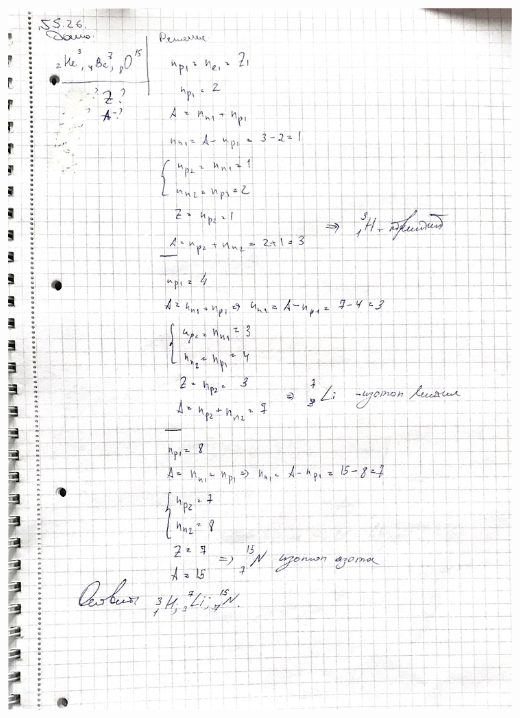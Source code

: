 \documentclass[12pt]{article}
\begin{document}
\begin{center}
\includegraphics[scale=0.2]{8_2.jpeg}\\
\end{center}
\end{document}
